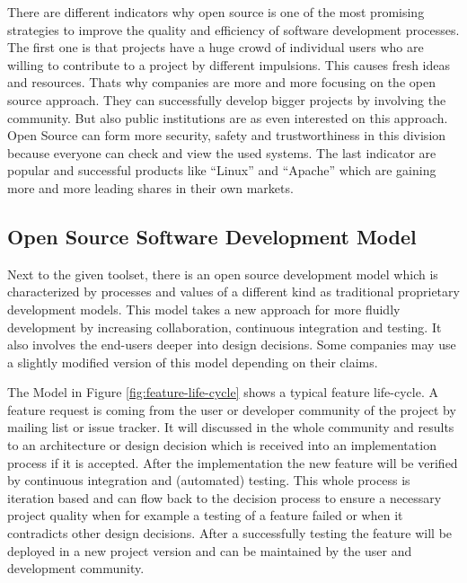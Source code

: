 \documentclass[DIV=calc,paper=a4,fontsize=9pt,twocolumn]{scrartcl}
\begin{document}
There are different indicators why open source is one of the most promising strategies to improve the quality and efficiency of software development processes. The first one is that projects have a huge crowd of individual users who are willing to contribute to a project by different impulsions. This causes fresh ideas and resources. Thats why companies are more and more focusing on the open source approach. They can successfully develop bigger projects by involving the community. But also public institutions are as even interested on this approach. Open Source can form more security, safety and trustworthiness in this division because everyone can check and view the used systems. The last indicator are popular and successful products like \enquote{Linux} and \enquote{Apache} which are gaining more and more leading shares in their own markets. \citep{fuggetta2003open}

\subsection{Open Source Software Development Model}

Next to the given toolset, there is an open source development model which is characterized by processes and values of a different kind as traditional proprietary development models. This model takes a new approach for more fluidly development by increasing collaboration, continuous integration and testing. It also involves the end-users deeper into design decisions. Some companies may use a slightly modified version of this model depending on their claims. \citep{Haddad11}

The Model in Figure \ref{fig:feature-life-cycle} shows a typical feature life-cycle. A feature request is coming from the user or developer community of the project by mailing list or issue tracker. It will discussed in the whole community and results to an architecture or design decision which is received into an implementation process if it is accepted. After the implementation the new feature will be verified by continuous integration and (automated) testing. This whole process is iteration based and can flow back to the decision process to ensure a necessary project quality when for example a testing of a feature failed or when it contradicts other design decisions. After a successfully testing the feature will be deployed in a new project version and can be maintained by the user and development community. \citep{Haddad11}
\end{document}
